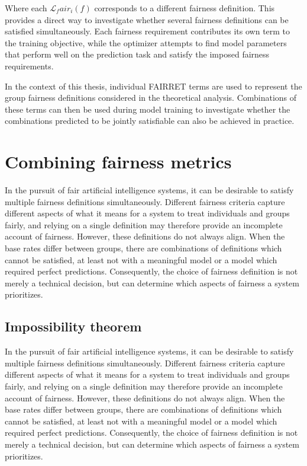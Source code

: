 Where each $\mathcal{L}_fair_i(f)$ corresponds to a different fairness definition. This provides a direct way to investigate whether several fairness definitions can be satisfied simultaneously. Each fairness requirement contributes its own term to the training objective, while the optimizer attempts to find model parameters that perform well on the prediction task and satisfy the imposed fairness requirements.

In the context of this thesis, individual FAIRRET terms are used to represent the group fairness definitions considered in the theoretical analysis. Combinations of these terms can then be used during model training to investigate whether the combinations predicted to be jointly satisfiable can also be achieved in practice.


\section{Combining fairness metrics}
In the pursuit of fair artificial intelligence systems, it can be desirable to satisfy multiple fairness definitions simultaneously. Different fairness criteria capture different aspects of what it means for a system to treat individuals and groups fairly, and relying on a single definition may therefore provide an incomplete account of fairness. However, these definitions do not always align. When the base rates differ between groups, there are combinations of definitions which cannot be satisfied, at least not with a meaningful model or a model which required perfect predictions. Consequently, the choice of fairness definition is not merely a technical decision, but can determine which aspects of fairness a system prioritizes.

\subsection{Impossibility theorem}
In the pursuit of fair artificial intelligence systems, it can be desirable to satisfy multiple fairness definitions simultaneously. Different fairness criteria capture different aspects of what it means for a system to treat individuals and groups fairly, and relying on a single definition may therefore provide an incomplete account of fairness. However, these definitions do not always align. When the base rates differ between groups, there are combinations of definitions which cannot be satisfied, at least not with a meaningful model or a model which required perfect predictions. Consequently, the choice of fairness definition is not merely a technical decision, but can determine which aspects of fairness a system prioritizes.

